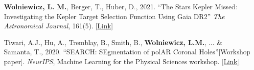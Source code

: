 \begin{cventries}
{\begin{cvitemize2}
            \textbf{Wolniewicz, L. M.}, Berger, T., Huber, D., 2021. ``The Stars Kepler Missed: Investigating the Kepler Target Selection Function Using Gaia DR2'' \textit{The Astronomical Journal}, 161(5). \href{https://iopscience.iop.org/article/10.3847/1538-3881/abee1d}{\textcolor{link}{[Link]}}
        \vspace{0.5mm}
        \item \label{search}
            Tiwari, A.J., Hu, A., Tremblay, B., Smith, B., \textbf{Wolniewicz, L.M.}, ... \& Samanta, T., 2020. ``SEARCH: SEgmentation of polAR Coronal Holes''[Workshop paper]. \textit{NeurIPS}, Machine Learning for the Physical Sciences workshop. \href{https://ml4physicalsciences.github.io/2020/files/NeurIPS_ML4PS_2020_83.pdf}{\textcolor{link}{[Link]}}
	\end{cvitemize2}
	\vspace{-2mm}
}

\end{cventries}
